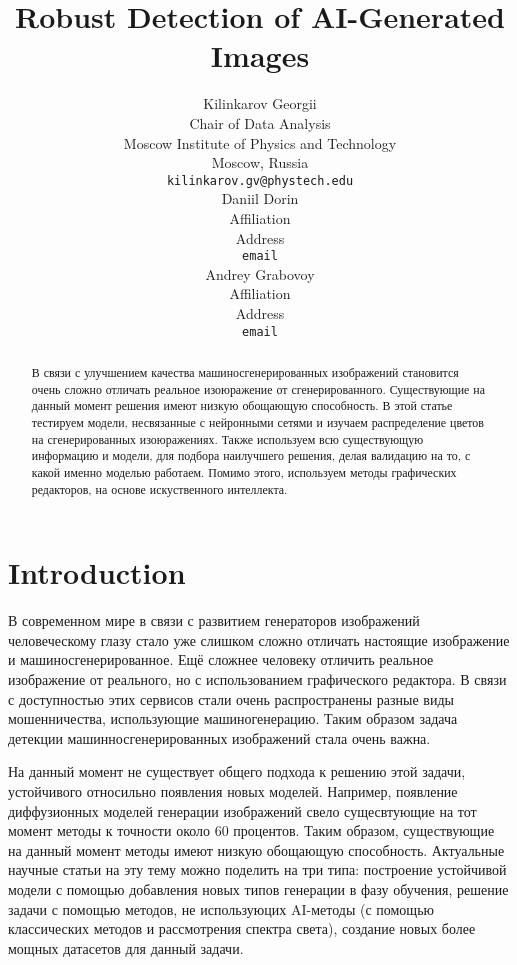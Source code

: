 \documentclass{article}
\title{ Robust Detection of AI-Generated Images}
\author{%
    Kilinkarov Georgii \\
    Chair of Data Analysis\\
    Moscow Institute of Physics and Technology\\
    Moscow, Russia \\
    \texttt{kilinkarov.gv@phystech.edu} \\
    \And
    Daniil Dorin  \\
    Affiliation \\
    Address \\
    \texttt{email} \\
    \AND
    Andrey Grabovoy \\
    Affiliation \\
    Address \\
    \texttt{email}
}
\date{}
\begin{document}
\maketitle

\begin{abstract}
В связи с улучшением качества машиносгенерированных изображений становится очень сложно отличать реальное изоюражение от сгенерированного.  Существующие на данный момент решения имеют низкую обощающую способность. В этой статье тестируем модели, несвязанные с нейронными сетями и изучаем распределение цветов на сгенерированных изоюражениях. Также используем всю существующую информацию и модели, для подбора наилучшего решения, делая валидацию на то, с какой именно моделью работаем. Помимо этого, используем методы графических редакторов, на основе искуственного интеллекта.
\end{abstract}


\section{Introduction}
\label{sec:introduction}

В современном мире в связи с развитием генераторов изображений человеческому глазу стало уже слишком сложно отличать настоящие изображение и машиносгенерированное. Ещё сложнее человеку отличить реальное изображение от реального, но с использованием графического редактора.\cite{OnlineDetection} В связи с доступностью этих сервисов стали очень распространены разные виды мошенничества, использующие машиногенерацию. Таким образом задача детекции машинносгенерированных изображений стала очень важна.


На данный момент не существует общего подхода к решению этой задачи, устойчивого относильно появления новых моделей. Например, появление диффузионных моделей генерации изображений свело сущесвтующие на тот момент методы к точности около 60 процентов\cite{GenImage}. Таким образом, существующие на данный момент методы имеют низкую обощающую способность. Актуальные научные статьи на эту тему можно поделить на три типа: построение устойчивой модели с помощью добавления новых типов генерации в фазу обучения\cite{AivsAi, OnlineDetection}, решение задачи с помощью методов, не используюцих AI-методы (с помощью классических методов и рассмотрения спектра света)\cite{ZeroShot}, создание новых более мощных датасетов для данный задачи\cite{GenImage, CIFAKE}.
\end{document}
